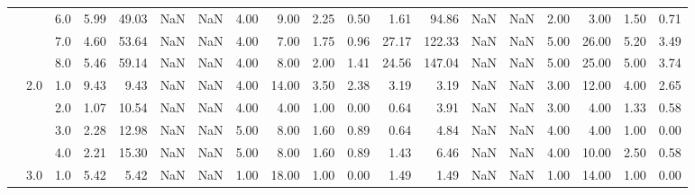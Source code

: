 \begin{tabular}{lllrrrrrrrrrrrrrrrr}
       &     & 6.0  &      5.99 &      49.03 &               NaN &                NaN &  4.00 &   9.00 &             2.25 &                         0.50 &      1.61 &      94.86 &               NaN &                NaN & 2.00 &   3.00 &             1.50 &                         0.71 \\
       &     & 7.0  &      4.60 &      53.64 &               NaN &                NaN &  4.00 &   7.00 &             1.75 &                         0.96 &     27.17 &     122.33 &               NaN &                NaN & 5.00 &  26.00 &             5.20 &                         3.49 \\
       &     & 8.0  &      5.46 &      59.14 &               NaN &                NaN &  4.00 &   8.00 &             2.00 &                         1.41 &     24.56 &     147.04 &               NaN &                NaN & 5.00 &  25.00 &             5.00 &                         3.74 \\
       & 2.0 & 1.0  &      9.43 &       9.43 &               NaN &                NaN &  4.00 &  14.00 &             3.50 &                         2.38 &      3.19 &       3.19 &               NaN &                NaN & 3.00 &  12.00 &             4.00 &                         2.65 \\
       &     & 2.0  &      1.07 &      10.54 &               NaN &                NaN &  4.00 &   4.00 &             1.00 &                         0.00 &      0.64 &       3.91 &               NaN &                NaN & 3.00 &   4.00 &             1.33 &                         0.58 \\
       &     & 3.0  &      2.28 &      12.98 &               NaN &                NaN &  5.00 &   8.00 &             1.60 &                         0.89 &      0.64 &       4.84 &               NaN &                NaN & 4.00 &   4.00 &             1.00 &                         0.00 \\
       &     & 4.0  &      2.21 &      15.30 &               NaN &                NaN &  5.00 &   8.00 &             1.60 &                         0.89 &      1.43 &       6.46 &               NaN &                NaN & 4.00 &  10.00 &             2.50 &                         0.58 \\
       & 3.0 & 1.0  &      5.42 &       5.42 &               NaN &                NaN &  1.00 &  18.00 &             1.00 &                         0.00 &      1.49 &       1.49 &               NaN &                NaN & 1.00 &  14.00 &             1.00 &                         0.00 \\

\end{tabular}
